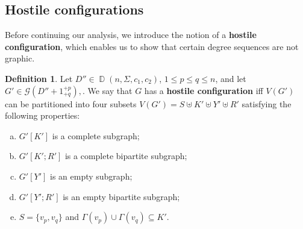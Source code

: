 \documentclass[11pt]{elsarticle}
\theoremstyle{plain}
\theoremstyle{definition}
\newtheorem{definition}[theorem]{Definition}
\def\G{\mathcal{G}}
\newcommand{\dds}[4]{\operatorname{\mathbb D}(#1,#2,#3,#4)}
\begin{document}
\subsection{Hostile configurations}\label{sec:hostile}

Before continuing our analysis, we introduce the notion of  a \textbf{hostile configuration},
which enables us to show that certain  degree sequences are not graphic.


\begin{definition}\label{df:hostile}
    Let $D'' \in \dds{n}{\Sigma}{c_1}{c_2}$,
    $1\le p\le q\le n$,   and let $G' \in \G(D''+1_{+q}^{+p}),$.
    We say that $G$ has a {\bf hostile configuration}
   iff  $V(G')$ can be partitioned into four subsets $V(G')=S \uplus K' \uplus Y' \uplus R'$
    satisfying the following properties:
    \begin{enumerate}[(a)]
    \item $G'[K']$  is a complete subgraph;
    \item $G'[K';R']$ is a complete bipartite subgraph;
    \item $G'[Y']$ is an empty subgraph;
    \item $G'[Y';R']$ is an empty bipartite subgraph;
    \item $S=\{v_p,v_q\}$ and   $\Gamma(v_p)\cup \Gamma(v_q) \subseteq K'$.
    \end{enumerate}
\end{definition}
\end{document}
